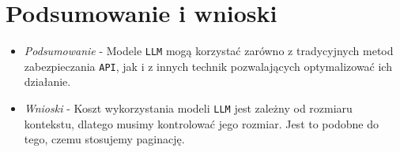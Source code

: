 \documentclass[12pt,aspectratio=169]{beamer}
\begin{document}
\newpage

\section{Podsumowanie i wnioski}
\begin{frame}
\begin{itemize}
  \item \textit{Podsumowanie} - Modele \texttt{LLM} mogą korzystać zarówno z
    tradycyjnych metod zabezpieczania \texttt{API}, jak i z innych technik
    pozwalających optymalizować ich działanie.
  \item \textit{Wnioski} - Koszt wykorzystania modeli \texttt{LLM} jest zależny
    od rozmiaru kontekstu, dlatego musimy kontrolować jego rozmiar. Jest to
    podobne do tego, czemu stosujemy paginację.
\end{itemize}
\end{frame}
\end{document}
